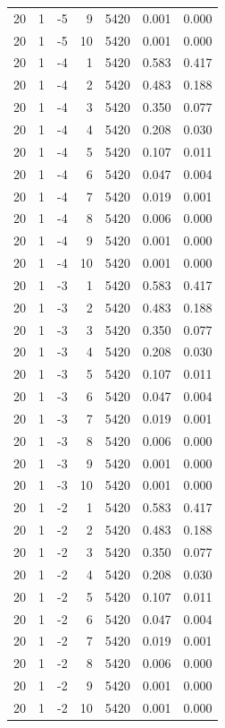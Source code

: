 \begin{table}
\begin{tabular}{rrrrrrr}
20 & 1 & -5 & 9 & 5420 & 0.001 & 0.000 \\
20 & 1 & -5 & 10 & 5420 & 0.001 & 0.000 \\
20 & 1 & -4 & 1 & 5420 & 0.583 & 0.417 \\
20 & 1 & -4 & 2 & 5420 & 0.483 & 0.188 \\
20 & 1 & -4 & 3 & 5420 & 0.350 & 0.077 \\
20 & 1 & -4 & 4 & 5420 & 0.208 & 0.030 \\
20 & 1 & -4 & 5 & 5420 & 0.107 & 0.011 \\
20 & 1 & -4 & 6 & 5420 & 0.047 & 0.004 \\
20 & 1 & -4 & 7 & 5420 & 0.019 & 0.001 \\
20 & 1 & -4 & 8 & 5420 & 0.006 & 0.000 \\
20 & 1 & -4 & 9 & 5420 & 0.001 & 0.000 \\
20 & 1 & -4 & 10 & 5420 & 0.001 & 0.000 \\
20 & 1 & -3 & 1 & 5420 & 0.583 & 0.417 \\
20 & 1 & -3 & 2 & 5420 & 0.483 & 0.188 \\
20 & 1 & -3 & 3 & 5420 & 0.350 & 0.077 \\
20 & 1 & -3 & 4 & 5420 & 0.208 & 0.030 \\
20 & 1 & -3 & 5 & 5420 & 0.107 & 0.011 \\
20 & 1 & -3 & 6 & 5420 & 0.047 & 0.004 \\
20 & 1 & -3 & 7 & 5420 & 0.019 & 0.001 \\
20 & 1 & -3 & 8 & 5420 & 0.006 & 0.000 \\
20 & 1 & -3 & 9 & 5420 & 0.001 & 0.000 \\
20 & 1 & -3 & 10 & 5420 & 0.001 & 0.000 \\
20 & 1 & -2 & 1 & 5420 & 0.583 & 0.417 \\
20 & 1 & -2 & 2 & 5420 & 0.483 & 0.188 \\
20 & 1 & -2 & 3 & 5420 & 0.350 & 0.077 \\
20 & 1 & -2 & 4 & 5420 & 0.208 & 0.030 \\
20 & 1 & -2 & 5 & 5420 & 0.107 & 0.011 \\
20 & 1 & -2 & 6 & 5420 & 0.047 & 0.004 \\
20 & 1 & -2 & 7 & 5420 & 0.019 & 0.001 \\
20 & 1 & -2 & 8 & 5420 & 0.006 & 0.000 \\
20 & 1 & -2 & 9 & 5420 & 0.001 & 0.000 \\
20 & 1 & -2 & 10 & 5420 & 0.001 & 0.000 \\

\end{tabular}
\end{table}
